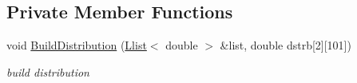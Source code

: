 \subsection*{Private Member Functions}
\begin{CompactItemize}
\item 
\hypertarget{classDiagnose_ef3922caa185f5d587edad0eaaf655d3}{
void \hyperlink{classDiagnose_ef3922caa185f5d587edad0eaaf655d3}{BuildDistribution} (\hyperlink{classLlist}{Llist}$<$ double $>$ \&list, double dstrb\mbox{[}2\mbox{]}\mbox{[}101\mbox{]})}
\label{classDiagnose_ef3922caa185f5d587edad0eaaf655d3}

\begin{CompactList}\small\item\em build distribution \item\end{CompactList}\end{CompactItemize}
